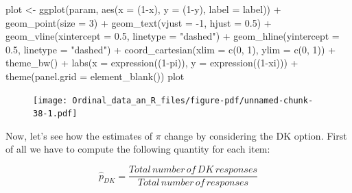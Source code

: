 \documentclass[
  letterpaper,
  DIV=11,
  numbers=noendperiod]{scrartcl}
\newenvironment{Shaded}{\begin{snugshade}}{\end{snugshade}}
\newcommand{\AttributeTok}[1]{\textcolor[rgb]{0.40,0.45,0.13}{#1}}
\newcommand{\DecValTok}[1]{\textcolor[rgb]{0.68,0.00,0.00}{#1}}
\newcommand{\FloatTok}[1]{\textcolor[rgb]{0.68,0.00,0.00}{#1}}
\newcommand{\FunctionTok}[1]{\textcolor[rgb]{0.28,0.35,0.67}{#1}}
\newcommand{\NormalTok}[1]{\textcolor[rgb]{0.00,0.23,0.31}{#1}}
\newcommand{\OtherTok}[1]{\textcolor[rgb]{0.00,0.23,0.31}{#1}}
\newcommand{\SpecialCharTok}[1]{\textcolor[rgb]{0.37,0.37,0.37}{#1}}
\newcommand{\StringTok}[1]{\textcolor[rgb]{0.13,0.47,0.30}{#1}}
\begin{document}
\begin{Shaded}
\begin{Highlighting}[]
\NormalTok{plot }\OtherTok{\textless{}{-}} \FunctionTok{ggplot}\NormalTok{(param, }\FunctionTok{aes}\NormalTok{(}\AttributeTok{x =}\NormalTok{ (}\DecValTok{1}\SpecialCharTok{{-}}\NormalTok{x), }\AttributeTok{y =}\NormalTok{ (}\DecValTok{1}\SpecialCharTok{{-}}\NormalTok{y), }\AttributeTok{label =}\NormalTok{ label)) }\SpecialCharTok{+}
  \FunctionTok{geom\_point}\NormalTok{(}\AttributeTok{size =} \DecValTok{3}\NormalTok{) }\SpecialCharTok{+}
  \FunctionTok{geom\_text}\NormalTok{(}\AttributeTok{vjust =} \SpecialCharTok{{-}}\DecValTok{1}\NormalTok{, }\AttributeTok{hjust =} \FloatTok{0.5}\NormalTok{) }\SpecialCharTok{+}
  \FunctionTok{geom\_vline}\NormalTok{(}\AttributeTok{xintercept =} \FloatTok{0.5}\NormalTok{, }\AttributeTok{linetype =} \StringTok{"dashed"}\NormalTok{) }\SpecialCharTok{+}
  \FunctionTok{geom\_hline}\NormalTok{(}\AttributeTok{yintercept =} \FloatTok{0.5}\NormalTok{, }\AttributeTok{linetype =} \StringTok{"dashed"}\NormalTok{) }\SpecialCharTok{+}
  \FunctionTok{coord\_cartesian}\NormalTok{(}\AttributeTok{xlim =} \FunctionTok{c}\NormalTok{(}\DecValTok{0}\NormalTok{, }\DecValTok{1}\NormalTok{), }\AttributeTok{ylim =} \FunctionTok{c}\NormalTok{(}\DecValTok{0}\NormalTok{, }\DecValTok{1}\NormalTok{)) }\SpecialCharTok{+}
  \FunctionTok{theme\_bw}\NormalTok{() }\SpecialCharTok{+}
  \FunctionTok{labs}\NormalTok{(}\AttributeTok{x =} \FunctionTok{expression}\NormalTok{((}\DecValTok{1}\SpecialCharTok{{-}}\NormalTok{pi)), }\AttributeTok{y =} \FunctionTok{expression}\NormalTok{((}\DecValTok{1}\SpecialCharTok{{-}}\NormalTok{xi))) }\SpecialCharTok{+}
  \FunctionTok{theme}\NormalTok{(}\AttributeTok{panel.grid =} \FunctionTok{element\_blank}\NormalTok{())}
\NormalTok{plot}
\end{Highlighting}
\end{Shaded}

\begin{figure}[H]

{\centering \texttt{[image: Ordinal\_data\_an\_R\_files/figure-pdf/unnamed-chunk-38-1.pdf]}

}

\end{figure}

Now, let's see how the estimates of \(\pi\) change by considering the DK
option. First of all we have to compute the following quantity for each
item:

\[
\hat{p}_{DK} = \frac{Total\, number\, of\, DK\, responses}{Total\, number\, of\, responses}
\]
\end{document}
